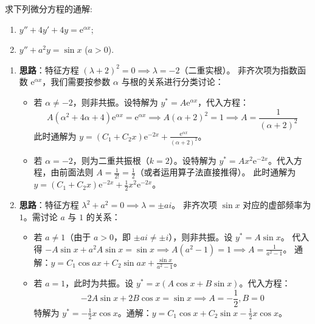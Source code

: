 \documentclass[lang=cn,11pt]{elegantbook}
\begin{document}
\begin{exercise}[含参方程的通解]
求下列微分方程的通解:
\begin{enumerate}
    \item[(1)] $y''+4y'+4y=\mathrm{e}^{\alpha x}$;
    \item[(2)] $y''+a^2y=\sin x$ ($a>0$).
\end{enumerate}
\end{exercise}
\begin{solution}
\begin{enumerate}
    \item[(1)] \textbf{思路}：特征方程 $(\lambda+2)^2=0 \implies \lambda=-2$（二重实根）。
    非齐次项为指数函数 $\mathrm{e}^{\alpha x}$，我们需要按参数 $\alpha$ 与根的关系进行分类讨论：
    \begin{itemize}
        \item 若 $\alpha \neq -2$，则非共振。设特解为 $y^* = A\mathrm{e}^{\alpha x}$，代入方程：
        \[
        A(\alpha^2+4\alpha+4)\mathrm{e}^{\alpha x} = \mathrm{e}^{\alpha x} \implies A(\alpha+2)^2 = 1 \implies A = \frac{1}{(\alpha+2)^2}
        \]
        此时通解为 $y = (C_1 + C_2 x)\mathrm{e}^{-2x} + \frac{\mathrm{e}^{\alpha x}}{(\alpha+2)^2}$。
        \item 若 $\alpha = -2$，则为二重共振根（$k=2$）。设特解为 $y^* = Ax^2\mathrm{e}^{-2x}$。代入方程，由前面法则 $A=\frac{1}{2!}=\frac{1}{2}$（或者运用算子法直接推得）。
        此时通解为 $y = (C_1 + C_2 x)\mathrm{e}^{-2x} + \frac{1}{2}x^2\mathrm{e}^{-2x}$。
    \end{itemize}
    
    \item[(2)] \textbf{思路}：特征方程 $\lambda^2+a^2=0 \implies \lambda=\pm ai$。
    非齐次项 $\sin x$ 对应的虚部频率为 $1$。需讨论 $a$ 与 $1$ 的关系：
    \begin{itemize}
        \item 若 $a \neq 1$（由于 $a>0$，即 $\pm a i \neq \pm i$），则非共振。设 $y^* = A\sin x$。
        代入得 $-A\sin x + a^2 A\sin x = \sin x \implies A(a^2-1)=1 \implies A = \frac{1}{a^2-1}$。
        通解：$y = C_1\cos ax + C_2\sin ax + \frac{\sin x}{a^2-1}$。
        \item 若 $a = 1$，此时为共振。设 $y^* = x(A\cos x + B\sin x)$。代入方程：
        \[
        -2A\sin x + 2B\cos x = \sin x \implies A = -\frac{1}{2}, B = 0
        \]
        特解为 $y^* = -\frac{1}{2}x\cos x$。通解：$y = C_1\cos x + C_2\sin x - \frac{1}{2}x\cos x$。
    \end{itemize}
\end{enumerate}
\end{solution}
\end{document}
